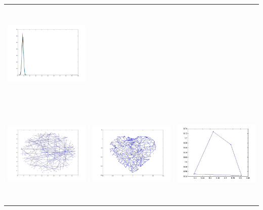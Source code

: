 \begin{tabular}{ |c|c|c| }
\includegraphics[width=5.0cm,height=5.0cm]{images/Eigenvalues_of_Whshart_Follow_TracyWidom.jpg}             \\
\includegraphics[width=5.0cm,height=5.0cm]{images/ErdosReyni_G_LT_giant_thresh_.jpg}         &
\includegraphics[width=5.0cm,height=5.0cm]{images/gursoy_atun_layou_topology_heart.jpg}       &
\includegraphics[width=5.0cm,height=5.0cm]{images/hypercube_3_Dimension.jpg}
\end{tabular}

